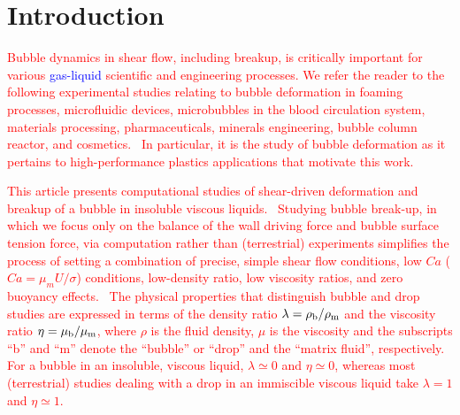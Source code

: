 \documentclass{elsarticle}
\begin{document}
\linenumbers
\section{Introduction}

%
%
\textcolor{red} {
Bubble dynamics in shear flow, including breakup, is critically important for various \textcolor{blue} {gas-liquid} scientific and engineering processes.  We refer the reader to the following experimental studies relating to bubble deformation in foaming processes, microfluidic devices, microbubbles in the blood circulation system, materials processing, pharmaceuticals, minerals engineering, bubble column reactor, and cosmetics\cite{ChuFinBouAtaHamPug19,MulTobDreFisWin08,BenRodFauPinFerPerGarMirLim18,DreSai15,EFTEKHARI2021837,WANG2023108105,doi:10.1021/acs.langmuir.1c01814,yoshikawa2010bubble,CanedoETAL}.  In particular, it is the study of bubble deformation as it pertains to high-performance plastics applications that motivate this work.
}
\par
\textcolor{red} {
This article presents computational studies of shear-driven deformation and breakup of a bubble in insoluble viscous liquids.  Studying bubble break-up, in which we focus only on the balance of the wall driving force and bubble surface tension force, via computation rather than (terrestrial) experiments simplifies the process of setting a combination of precise, simple shear flow conditions, low $Ca$ ($Ca=\mu_{m}U/\sigma$) conditions, low-density ratio, low viscosity ratios, and zero buoyancy effects.  The physical properties that distinguish bubble and drop studies are expressed in terms of the density ratio $\lambda = \rho_{\rm b} / \rho_{\rm m}$ and the viscosity ratio $\eta = \mu_{\rm b} / \mu_{\rm m}$, where $\rho$ is the fluid density, $\mu$ is the viscosity and the subscripts ``b'' and ``m'' denote the ``bubble'' or ``drop'' and the ``matrix fluid'', respectively.  For a bubble in an insoluble, viscous liquid, $\lambda \simeq 0$ and $\eta \simeq 0$, whereas most (terrestrial) studies dealing with a drop in an immiscible viscous liquid take $\lambda =1$ and $\eta \simeq 1$.  
}
\par
\end{document}
